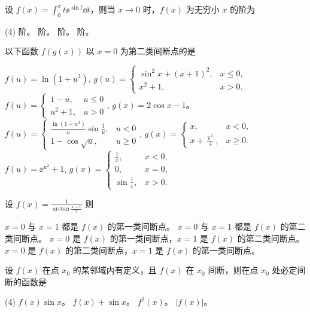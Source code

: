 \begin{ti}
	设 $f(x) = \int_0^x t \ee^{\sin t} \dd{t}$，则当 $x \to 0$ 时，$f(x)$ 为无穷小 $x$ 的阶为
	\begin{tasks}(4)
		 阶。
		 阶。
		 阶。
		 阶。
	\end{tasks}
\end{ti}

\begin{ti}
	以下函数 $f(g(x))$ 以 $x=0$ 为第二类间断点的是
	\begin{tasks}
		\task $f(u) = \ln(1+u^2)$, $g(u) = \begin{cases}
			\sin^2x + (x+1)^2, & x \leq 0, \\
			x^2+1, & x > 0.
		\end{cases}$
		\task $f(u) = \begin{cases}
			1-u, & u \leq 0 \\
			u^2 + 1, & u > 0
		\end{cases}$, $g(x) = 2\cos x-1$。
		\task $f(u) = \begin{cases}
			\frac{\ln(1-u^2)}{u} \sin\frac{1}{u}, & u < 0 \\
			1 - \cos\sqrt{u}, & u \geq 0
		\end{cases}$, $g(x) = \begin{cases}
			x, & x < 0, \\
			x + \frac{\uppi^2}{4}, & x \geq 0.
		\end{cases}$
		\task $f(u) = \ee^{u^2} + 1$, $g(x) = \begin{cases}
			\frac{1}{x}, & x < 0, \\
			0, & x = 0, \\
			\sin\frac{1}{x}, & x > 0.
		\end{cases}$
	\end{tasks}
\end{ti}

\begin{ti}
	设 $f(x) = \frac{1}{\arctan\frac{x-1}{x}}$ 则
	\begin{tasks}
		\task $x=0$ 与 $x=1$ 都是 $f(x)$ 的第一类间断点。
		\task $x=0$ 与 $x=1$ 都是 $f(x)$ 的第二类间断点。
		\task $x=0$ 是 $f(x)$ 的第一类间断点，$x=1$ 是 $f(x)$ 的第二类间断点。
		\task $x=0$ 是 $f(x)$ 的第二类间断点，$x=1$ 是 $f(x)$ 的第一类间断点。
	\end{tasks}
\end{ti}

\begin{ti}
	设 $f(x)$ 在点 $x_0$ 的某邻域内有定义，且 $f(x)$ 在 $x_0$ 间断，则在点 $x_0$ 处必定间断的函数是
	\begin{tasks}(4)
		\task $f(x) \sin x$。
		\task $f(x) + \sin x$。
		\task $f^2(x)$。
		\task $|f(x)|$。
	\end{tasks}
\end{ti}


